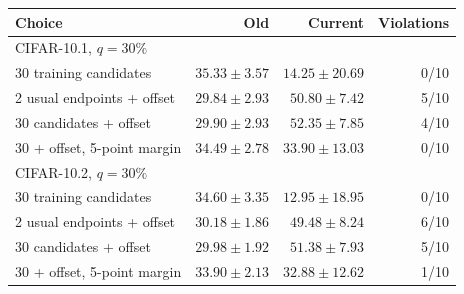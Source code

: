 \begin{tabular}{lrrr}
\toprule
Choice & Old & Current & Violations\\
\midrule
\multicolumn{4}{l}{CIFAR-10.1, $q=30\%$}\\
30 training candidates & $35.33\pm3.57$ & $14.25\pm20.69$ & 0/10\\
2 usual endpoints + offset & $29.84\pm2.93$ & $50.80\pm7.42$ & 5/10\\
30 candidates + offset & $29.90\pm2.93$ & $52.35\pm7.85$ & 4/10\\
30 + offset, 5-point margin & $34.49\pm2.78$ & $33.90\pm13.03$ & 0/10\\
\multicolumn{4}{l}{CIFAR-10.2, $q=30\%$}\\
30 training candidates & $34.60\pm3.35$ & $12.95\pm18.95$ & 0/10\\
2 usual endpoints + offset & $30.18\pm1.86$ & $49.48\pm8.24$ & 6/10\\
30 candidates + offset & $29.98\pm1.92$ & $51.38\pm7.93$ & 5/10\\
30 + offset, 5-point margin & $33.90\pm2.13$ & $32.88\pm12.62$ & 1/10\\
\bottomrule
\end{tabular}

